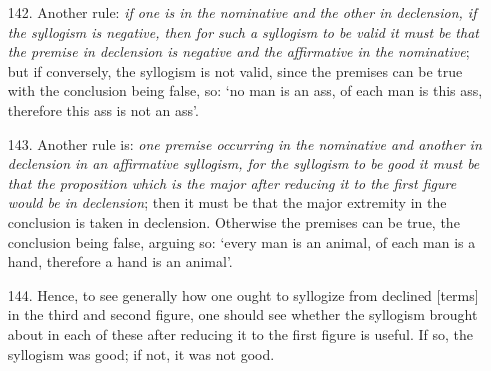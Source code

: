 \begin{itemize}
\item[142.] Another rule: \textit{if one is in the nominative and the other in declension, if the syllogism is negative, then for such a syllogism to be valid it must be that the premise in declension is negative and the affirmative in the nominative}; but if conversely, the syllogism is not valid, since the premises can be true with the conclusion being false, so: `no man is an ass, of each man is this ass, therefore this ass is not an ass'. 
\item[143.] Another rule is: \textit{one premise occurring in the nominative and another in declension in an affirmative syllogism, for the syllogism to be good it must be that the proposition which is the major after reducing it to the first figure would be in declension}; then it must be that the major extremity in the conclusion is taken in declension. Otherwise the premises can be true, the conclusion being false, arguing so: `every man is an animal, of each man is a hand, therefore a hand is an animal'. 
\item[144.] Hence, to see generally how one ought to syllogize from declined [terms] in the third and second figure, one should see whether the syllogism brought about in each of these after reducing it to the first figure is useful. If so, the syllogism was good; if not, it was not good.
\end{itemize}
